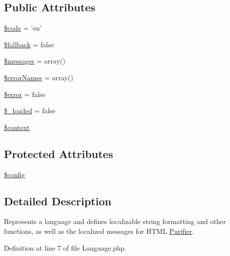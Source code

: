 \subsection*{Public Attributes}
\begin{DoxyCompactItemize}
\item 
\hyperlink{classHTMLPurifier__Language_a5d7bd0b73124250f04e8d6848f16c3ff}{\$code} = 'en'
\item 
\hyperlink{classHTMLPurifier__Language_ae37ea0bda359fc0ab33db4d74c267a47}{\$fallback} = false
\item 
\hyperlink{classHTMLPurifier__Language_ae0b2a027ff425c9ebefc0e4f2728c7ab}{\$messages} = array()
\item 
\hyperlink{classHTMLPurifier__Language_ab6f8454f90315876de68931909f1f7ac}{\$error\+Names} = array()
\item 
\hyperlink{classHTMLPurifier__Language_abb0604315d77bc0d8793c695be23a3c7}{\$error} = false
\item 
\hyperlink{classHTMLPurifier__Language_a972e2795bb72936c59aa28d6b893e7e9}{\$\+\_\+loaded} = false
\item 
\hyperlink{classHTMLPurifier__Language_ae4650de6fad492c6179523ae7ec7ba7d}{\$context}
\end{DoxyCompactItemize}
\subsection*{Protected Attributes}
\begin{DoxyCompactItemize}
\item 
\hyperlink{classHTMLPurifier__Language_a3bbdf4305e5d242a46270e8c8fd912c8}{\$config}
\end{DoxyCompactItemize}


\subsection{Detailed Description}
Represents a language and defines localizable string formatting and other functions, as well as the localized messages for H\+T\+M\+L \hyperlink{classPurifier}{Purifier}. 

Definition at line 7 of file Language.\+php.



